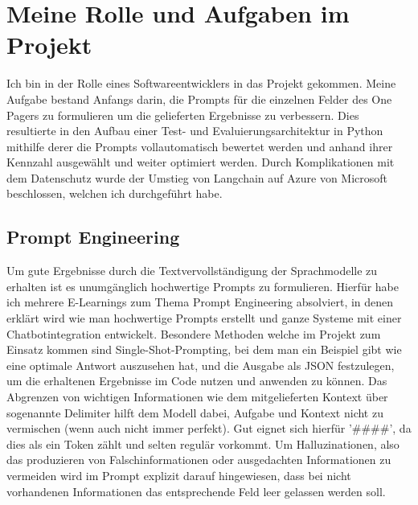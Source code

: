 \section{Meine Rolle und Aufgaben im Projekt}
Ich bin in der Rolle eines Softwareentwicklers in das Projekt gekommen. Meine Aufgabe bestand Anfangs darin, die Prompts
für die einzelnen Felder des One Pagers zu formulieren um die gelieferten Ergebnisse zu verbessern. Dies resultierte in
den Aufbau einer Test- und Evaluierungsarchitektur in Python mithilfe derer die Prompts vollautomatisch bewertet werden
und anhand ihrer Kennzahl ausgewählt und weiter optimiert werden. Durch Komplikationen mit dem Datenschutz wurde der
Umstieg von Langchain auf Azure von Microsoft beschlossen, welchen ich durchgeführt habe. 

\subsection{Prompt Engineering}
Um gute Ergebnisse durch die Textvervollständigung der Sprachmodelle zu erhalten ist es unumgänglich hochwertige Prompts
zu formulieren. Hierfür habe ich mehrere E-Learnings zum Thema Prompt Engineering absolviert, in denen erklärt wird wie
man hochwertige Prompts erstellt und ganze Systeme mit einer Chatbotintegration entwickelt. Besondere Methoden welche im
Projekt zum Einsatz kommen sind Single-Shot-Prompting, bei dem man ein Beispiel gibt wie eine optimale Antwort
auszusehen hat, und die Ausgabe als JSON festzulegen, um die erhaltenen Ergebnisse im Code nutzen und anwenden zu
können. Das Abgrenzen von wichtigen Informationen wie dem mitgelieferten Kontext über sogenannte Delimiter hilft dem
Modell dabei, Aufgabe und Kontext nicht zu vermischen (wenn auch nicht immer perfekt). Gut eignet sich hierfür
'\#\#\#\#', da dies als ein Token zählt und selten regulär vorkommt. Um Halluzinationen, also das produzieren von
Falschinformationen oder ausgedachten Informationen zu vermeiden wird im Prompt explizit darauf hingewiesen, dass bei
nicht vorhandenen Informationen das entsprechende Feld leer gelassen werden soll. 

